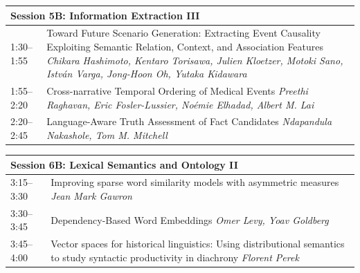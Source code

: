 \documentclass{book}
\renewcommand{\large}{\fontsize{36}{40}\selectfont}
\begin{document}
\begin{tabular}{p{3in}p{16in}}
  \multicolumn{2}{l}{\bfseries\large Session 5B: Information Extraction III} \\\hline

    
    1:30--1:55
    &	Toward Future Scenario Generation: Extracting Event Causality Exploiting Semantic Relation, Context, and Association Features \newline 
    {\itshape Chikara Hashimoto, Kentaro Torisawa, Julien Kloetzer, Motoki Sano, István Varga, Jong-Hoon Oh, Yutaka Kidawara} \\
    
    1:55--2:20
    &	Cross-narrative Temporal Ordering of Medical Events \newline 
    {\itshape Preethi Raghavan, Eric Fosler-Lussier, Noémie Elhadad, Albert M. Lai} \\
    
    2:20--2:45
    &	Language-Aware Truth Assessment of Fact Candidates \newline 
    {\itshape Ndapandula Nakashole, Tom M. Mitchell} \\
    
\end{tabular}

\begin{tabular}{p{3in}p{16in}}
  \multicolumn{2}{l}{\bfseries\large Session 6B: Lexical Semantics and Ontology II} \\\hline

    
    3:15--3:30
    &	Improving sparse word similarity models with asymmetric measures \newline 
    {\itshape Jean  Mark Gawron} \\
    
    3:30--3:45
    &	Dependency-Based Word Embeddings \newline 
    {\itshape Omer Levy, Yoav Goldberg} \\
    
    3:45--4:00
    &	Vector spaces for historical linguistics: Using distributional semantics to study syntactic productivity in diachrony \newline 
    {\itshape Florent Perek} \\
    
\end{tabular}
\end{document}

